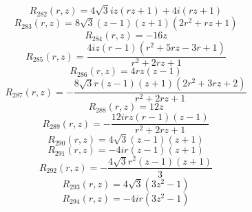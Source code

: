 \documentclass[11pt,a4paper]{article}
\begin{document}
\begin{equation}
R_{282}(r,z)=4 \sqrt{3} i z \left(r z + 1\right) + 4 i \left(r z + 1\right)
\label{eq:cat-rational-282}
\end{equation}
\begin{equation}
R_{283}(r,z)=8 \sqrt{3} \left(z - 1\right) \left(z + 1\right) \left(2 r^{2} + r z + 1\right)
\label{eq:cat-rational-283}
\end{equation}
\begin{equation}
R_{284}(r,z)=- 16 z
\label{eq:cat-rational-284}
\end{equation}
\begin{equation}
R_{285}(r,z)=\frac{4 i z \left(r - 1\right) \left(r^{2} + 5 r z - 3 r + 1\right)}{r^{2} + 2 r z + 1}
\label{eq:cat-rational-285}
\end{equation}
\begin{equation}
R_{286}(r,z)=4 r z \left(z - 1\right)
\label{eq:cat-rational-286}
\end{equation}
\begin{equation}
R_{287}(r,z)=- \frac{8 \sqrt{3} r \left(z - 1\right) \left(z + 1\right) \left(2 r^{2} + 3 r z + 2\right)}{r^{2} + 2 r z + 1}
\label{eq:cat-rational-287}
\end{equation}
\begin{equation}
R_{288}(r,z)=12 z
\label{eq:cat-rational-288}
\end{equation}
\begin{equation}
R_{289}(r,z)=- \frac{12 i r z \left(r - 1\right) \left(z - 1\right)}{r^{2} + 2 r z + 1}
\label{eq:cat-rational-289}
\end{equation}
\begin{equation}
R_{290}(r,z)=4 \sqrt{3} \left(z - 1\right) \left(z + 1\right)
\label{eq:cat-rational-290}
\end{equation}
\begin{equation}
R_{291}(r,z)=- 4 i r \left(z - 1\right) \left(z + 1\right)
\label{eq:cat-rational-291}
\end{equation}
\begin{equation}
R_{292}(r,z)=- \frac{4 \sqrt{3} r^{2} \left(z - 1\right) \left(z + 1\right)}{3}
\label{eq:cat-rational-292}
\end{equation}
\begin{equation}
R_{293}(r,z)=4 \sqrt{3} \left(3 z^{2} - 1\right)
\label{eq:cat-rational-293}
\end{equation}
\begin{equation}
R_{294}(r,z)=- 4 i r \left(3 z^{2} - 1\right)
\label{eq:cat-rational-294}
\end{equation}
\end{document}
